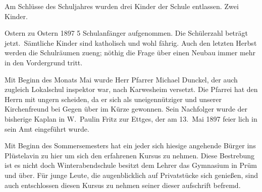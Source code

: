 

Am Schlüsse des Schuljahres wurden drei Kinder\ob
der Schule entlassen. Zwei Kinder.

\pend
{}
\pstart

Ostern zu Ostern 1897 5 Schulanfänger\ob
aufgenommen. Die Schülerzahl beträgt jetzt.\ Sämtliche Kinder sind katholisch und wohl\ohb
fährig. Auch den letzten Herbst werden die\ob
Schulräumen zueng; nöthig die Frage über einen\ob
Neubau immer mehr in den Vordergrund tritt.

\pend
{}
\pstart

Mit Beginn des Monats Mai wurde Herr Pfarrer\ob
Michael Dunckel, der auch zugleich Lokalschul\ohb
inspektor war, nach Karwesheim\unsicher{} versetzt. Die Pfarrei hat den\ob
Herrn mit ungern scheiden, da er sich als uneigennütziger\ob
und unserer Kirchenfreund bei Gegen\ohb
über im Kürze gewonnen. Sein Nachfolger\ob
wurde der bisherige Kaplan in W.\ Paulin Fritz\ob
zur Ettges, der am 13.\ Mai 1897 feier\ohb
lich in sein Amt eingeführt wurde.

Mit Beginn des Sommersemesters hat ein jeder sich\ob
hiesige angehende Bürger ins Plüstelavin\unsicher{} zu hier\ob
um sich den erfahrenen Kursus zu nehmen.\ob
Diese Bestrebung ist es nicht doch Winterabendschule besitzt\ob
dem Lehrer das Gymnasium in Prüm und über.\ob
Für junge Leute, die augenblicklich auf Privatstücke\ob
sich genießen, sind auch entschlossen diesen\ob
Kursus zu nehmen seiner dieser aufschrift befremd.
\pend
